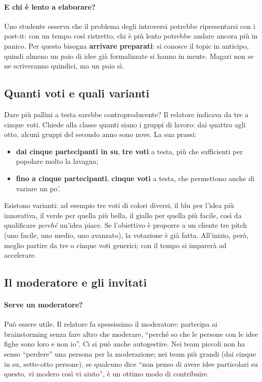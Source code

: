 \paragraph{E chi è lento a elaborare?} Uno studente osserva che il problema degli
introversi potrebbe ripresentarsi con i post-it: con un tempo così ristretto, chi è più
lento potrebbe andare ancora più in panico. Per questo bisogna \textbf{arrivare
preparati}: si conosce il topic in anticipo, quindi almeno un paio di idee già
formalizzate si hanno in mente. Magari non se ne scriveranno quindici, ma un paio sì.

\subsection{Quanti voti e quali varianti}

Dare più pallini a testa sarebbe controproducente? Il relatore indicava da tre a
cinque voti. Chiede alla classe quanti siano i gruppi di lavoro: dai quattro agli otto,
alcuni gruppi del secondo anno sono nove. La sua prassi:
\begin{itemize}
  \item \textbf{dai cinque partecipanti in su}, \textbf{tre voti} a testa, più che
        sufficienti per popolare molto la lavagna;
  \item \textbf{fino a cinque partecipanti}, \textbf{cinque voti} a testa, che
        permettono anche di variare un po'.
\end{itemize}
Esistono varianti: ad esempio tre voti di colori diversi, il blu per l'idea più
innovativa, il verde per quella più bella, il giallo per quella più facile, così da
qualificare \emph{perché} un'idea piace. Se l'obiettivo è proporre a un cliente tre
pitch (uno facile, uno medio, uno avanzato), la votazione è già fatta. All'inizio,
però, meglio partire da tre o cinque voti generici; con il tempo si imparerà ad
accelerare.

\subsection{Il moderatore e gli invitati}

\paragraph{Serve un moderatore?} Può essere utile. Il relatore fa spessissimo il
moderatore: partecipa ai brainstorming senza fare altro che moderare, ``perché so che
le persone con le idee fighe sono loro e non io''. Ci si può anche autogestire. Nei team
piccoli non ha senso ``perdere'' una persona per la moderazione; nei team più grandi
(dai cinque in su, sette-otto persone), se qualcuno dice ``non penso di avere idee
particolari su questo, vi modero così vi aiuto'', è un ottimo modo di contribuire.

